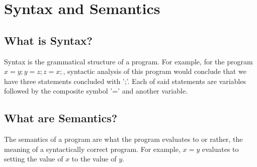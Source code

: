 \section{Syntax and Semantics}

\subsection{What is Syntax?}

Syntax is the grammatical structure of a program. For example,
for the program $x=y;y=z;z=x;$, syntactic analysis of this 
program would conclude that we have three statements concluded
with ';'. Each of said statements are variables followed by
the composite symbol '=' and another variable.

\subsection{What are Semantics?}

The semantics of a program are what the program evaluates
to or rather, the meaning of a syntactically correct program.
For example, $x=y$ evaluates to setting the value of $x$ to the 
value of $y$.